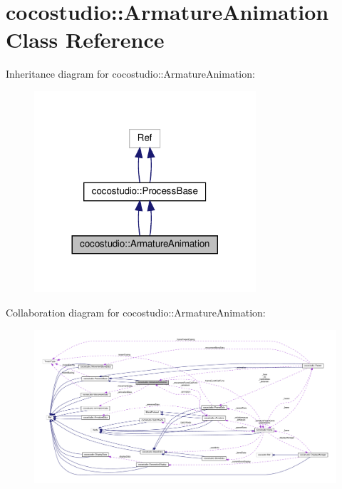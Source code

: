 \hypertarget{classcocostudio_1_1ArmatureAnimation}{}\section{cocostudio\+:\+:Armature\+Animation Class Reference}
\label{classcocostudio_1_1ArmatureAnimation}


Inheritance diagram for cocostudio\+:\+:Armature\+Animation\+:
\nopagebreak
\begin{figure}[H]
\begin{center}
\leavevmode
\includegraphics[width=233pt]{classcocostudio_1_1ArmatureAnimation__inherit__graph}
\end{center}
\end{figure}


Collaboration diagram for cocostudio\+:\+:Armature\+Animation\+:
\nopagebreak
\begin{figure}[H]
\begin{center}
\leavevmode
\includegraphics[width=350pt]{classcocostudio_1_1ArmatureAnimation__coll__graph}
\end{center}
\end{figure}
